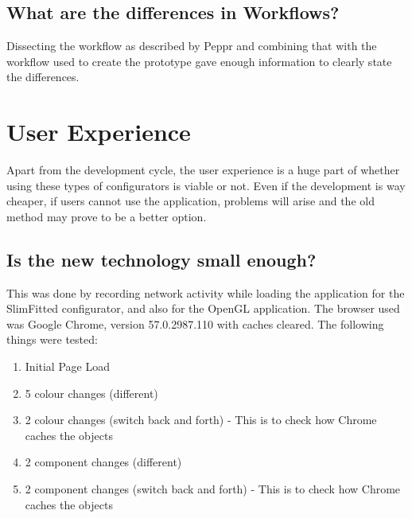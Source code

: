 \subsection{What are the differences in Workflows?}
Dissecting the workflow as described by Peppr and combining that with the workflow used to create the prototype gave enough information to clearly state the differences.

\section{User Experience}
Apart from the development cycle, the user experience is a huge part of whether using these types of configurators is viable or not. Even if the development is way cheaper, if users cannot use the application, problems will arise and the old method may prove to be a better option.

\subsection{Is the new technology small enough?}
This was done by recording network activity while loading the application for the SlimFitted configurator, and also for the OpenGL application. The browser used was Google Chrome, version 57.0.2987.110 with caches cleared. The following things were tested:
\label{subsub:techSmall}
​\begin{enumerate}
\item {Initial Page Load}
\item{5 colour changes (different)}
\item {2 colour changes (switch back and forth) - This is to check how Chrome caches the objects}
\item {2 component changes (different)}
\item {2 component changes (switch back and forth) - This is to check how Chrome caches the objects}
\end{enumerate}

